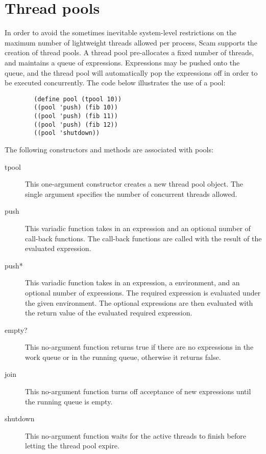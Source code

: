 \section{Thread pools}
In order to avoid the sometimes inevitable system-level restrictions
on the maximum number of lightweight threads allowed per process, Scam
supports the creation of thread pools.  A thread pool pre-allocates
a fixed number of threads, and maintains a queue of expressions.
Expressions may be pushed onto the queue, and the thread pool
will automatically pop the expressions off in order to be executed
concurrently.  The code below
illustrates the use of a pool:

    \begin{verbatim}
        (define pool (tpool 10))
        ((pool 'push) (fib 10))
        ((pool 'push) (fib 11))
        ((pool 'push) (fib 12))
        ((pool 'shutdown))
    \end{verbatim} 


The following constructors and methods are associated with pools:

\begin{description}
\item[tpool]
This one-argument constructor creates a new thread pool object.
The single argument specifies the number of concurrent threads allowed.

\item[push]
This variadic function takes in an expression and an optional
number of call-back functions.  The call-back functions are called
with the result of the evaluated expression.

\item[push*]
This variadic function takes in an expression, a environment,
and an optional number of expressions. 
The required expression is evaluated under the given environment.
The optional expressions are then evaluated with the return value
of the evaluated required expression.
\item[empty?]

This no-argument function returns true if there are no expressions
in the work queue or in the running queue, otherwise it returns
false.

\item[join]
This no-argument function turns off acceptance of new expressions
until the running queue is empty.

\item[shutdown]
This no-argument function waits for the active threads to finish
before letting the thread pool expire.
\end{description}

